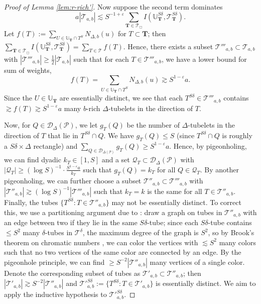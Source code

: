 \documentclass{amsart}
\newcommand{\T}{\mathcal{T}}
\newcommand{\U}{\mathbb{U}}
\newcommand{\eps}{\varepsilon}
\newcommand{\lesim}{\lesssim}
\newcommand{\gesim}{\gtrsim}
\newcommand{\bT}{\mathbf{T}}
\newcommand{\cD}{\mathcal{D}}
\newcommand{\cQ}{\mathcal{Q}}
\newcommand{\cP}{\mathcal{P}}
\begin{document}
\begin{proof}[Proof of Lemma \ref{lem:r-rich'}]
    Now suppose the second term dominates \[a|\T_{a,b}| \lesim S^{-1+\eps} \sum_{\bT \in \T_{\Box}} I(\U_\bT^{S\delta}, \T_\bT^{S\delta}).\]
    Let $f(T) := \sum_{U \in \U_{\bT} \cap T^S} N_{\Delta, b} (u)$ for $T\subset \bT$; then $\sum_{\bT \in \T_{\Box}} I(\U_\bT^{S\delta}, \T_\bT^{S\delta}) = \sum_{T \in \T} f(T)$. Hence, there exists a subset $\T'''_{a,b} \subset \T_{a,b}$ with $|\T'''_{a,b}| \ge \frac{1}{2} |\T_{a,b}|$ such that for each $T \in \T'''_{a,b}$, we have 
    a lower bound for sum of weights,
    \begin{equation*}
        f(T) = \sum_{U \in \U_{\bT} \cap T^S} N_{\Delta, b} (u) \gesim S^{1-\eps} a.
    \end{equation*}
    Since the $U \in \U_{\bT}$ are essentially distinct, we see that each $T^{S\delta} \in \T'''_{a,b}$ contains $\gesim f(T) \gesim S^{1-\eps} a$ many $b$-rich $\Delta$-tubelets in the direction of $T$.

    Now, for $Q \in \cD_\Delta (\cP)$, we let $g_T (Q)$ be the number of $\Delta$-tubelets in the direction of $T$ that lie in $T^{S\delta} \cap Q$. We have $g_T (Q) \le S$ (since $T^{S\delta} \cap Q$ is roughly a $S\delta \times \Delta$ rectangle) and $\sum_{Q \in \cD_{\Delta (\cP)}} g_T (Q) \ge S^{1-\eps} a$. Hence, by pigeonholing, we can find dyadic $k_T \in [1, S]$ and a set $\cQ_T \subset \cD_\Delta (\cP)$ with $|\cQ_T| \ge (\log S)^{-1} \cdot \frac{S^{1-\eps} a}{k_T}$ such that $g_T (Q) = k_T$ for all $Q \in \cQ_T$. By another pigeonholing, we can further choose a subset $\T''_{a,b} \subset \T'''_{a,b}$ with $|\T''_{a,b}| \gesim (\log S)^{-1} |\T'''_{a,b}|$ such that $k_T = k$ is the same for all $T \in \T''_{a,b}$. Finally, the tubes $\{ T^{S\delta} : T \in \T''_{a,b} \}$ may not be essentially distinct. To correct this, we use a partitioning argument due to \cite{fu2021incidence}: draw a graph on tubes in $\T''_{a,b}$ with an edge between two if they lie in the same $S\delta$-tube; since each $S\delta$-tube contains $\le S^2$ many $\delta$-tubes in $\T^\delta$, the maximum degree of the graph is $S^2$, so by Brook's theorem on chromatic numbers \cite{brooksthm}, we can color the vertices with $\lesim S^2$ many colors such that no two vertices of the same color are connected by an edge. By the pigeonhole principle, we can find $\ge S^{-2} |\T''_{a,b}|$ many vertices of a single color. Denote the corresponding subset of tubes as $\T'_{a,b} \subset \T''_{a,b}$; then $|\T'_{a,b}| \gesim S^{-2} |\T''_{a,b}|$ and $\T'^{S\delta}_{a,b} := \{ T^{S\delta} : T \in \T'_{a,b} \}$ is essentially distinct. We aim to apply the inductive hypothesis to $\T'^{S\delta}_{a,b}$.


\end{proof}
\end{document}
